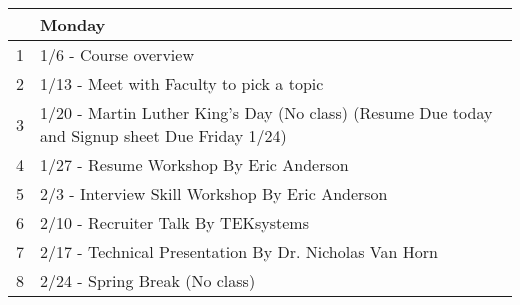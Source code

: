 
\begin{tabularx}{\linewidth}{|r|X|}


\hline
 & Monday
\\\hline\hline

1
&

1/6 - Course overview
\\\hline


2
&

1/13 - Meet with Faculty to pick a topic 
\\\hline


3
&

1/20 - Martin Luther King's Day (No class) (Resume Due today and Signup sheet Due Friday 1/24)
\\\hline


4
&

1/27 - Resume Workshop By Eric Anderson
\\\hline


5
&

2/3 - Interview Skill Workshop By Eric Anderson
\\\hline


6
&

2/10 - Recruiter Talk By TEKsystems
\\\hline


7
&

2/17 - Technical Presentation By Dr. Nicholas Van Horn 
\\\hline


8
&

2/24 -  Spring Break (No class)
\\\hline


\end{tabularx}
